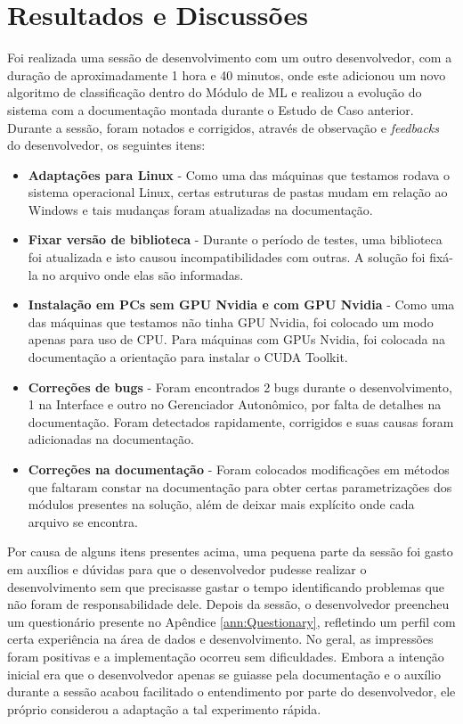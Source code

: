 \documentclass[portugues]{ic-tese}
\begin{document}
\section{Resultados e Discussões}

Foi realizada uma sessão de desenvolvimento com um outro desenvolvedor, com a duração de aproximadamente 1 hora e 40 minutos, onde este adicionou um novo algoritmo de classificação dentro do Módulo de ML e realizou a evolução do sistema com a documentação montada durante o Estudo de Caso anterior. Durante a sessão, foram notados e corrigidos, através de observação e \textit{feedbacks} do desenvolvedor, os seguintes itens:

\begin{itemize}
\item \textbf{Adaptações para Linux} - Como uma das máquinas que testamos rodava o sistema operacional Linux, certas estruturas de pastas mudam em relação ao Windows e tais mudanças foram atualizadas na documentação.
\item \textbf{Fixar versão de biblioteca} - Durante o período de testes, uma biblioteca foi atualizada e isto causou incompatibilidades com outras. A solução foi fixá-la no arquivo onde elas são informadas.
\item \textbf{Instalação em PCs sem GPU Nvidia e com GPU Nvidia} - Como uma das máquinas que testamos não tinha GPU Nvidia, foi colocado um modo apenas para uso de CPU. Para máquinas com GPUs Nvidia, foi colocada na documentação a orientação para instalar o CUDA Toolkit.
\item \textbf{Correções de bugs} - Foram encontrados 2 bugs durante o desenvolvimento, 1 na Interface e outro no Gerenciador Autonômico, por falta de detalhes na documentação. Foram detectados rapidamente, corrigidos e suas causas foram adicionadas na documentação.
\item \textbf{Correções na documentação} - Foram colocados modificações em métodos que faltaram constar na documentação para obter certas parametrizações dos módulos presentes na solução, além de deixar mais explícito onde cada arquivo se encontra.
\end{itemize}

Por causa de alguns itens presentes acima, uma pequena parte da sessão foi gasto em auxílios e dúvidas para que o desenvolvedor pudesse realizar o desenvolvimento sem que precisasse gastar o tempo identificando problemas que não foram de responsabilidade dele. Depois da sessão, o desenvolvedor preencheu um questionário presente no Apêndice \ref{ann:Questionary}, refletindo um perfil com certa experiência na área de dados e desenvolvimento. No geral, as impressões foram positivas e a implementação ocorreu sem dificuldades. Embora a intenção inicial era que o desenvolvedor apenas se guiasse pela documentação e o auxílio durante a sessão acabou facilitado o entendimento por parte do desenvolvedor, ele próprio considerou a adaptação a tal experimento rápida.
\end{document}
